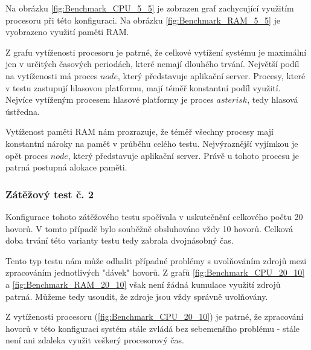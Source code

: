 \documentclass[ing,male,java,dept460]{diploma}						%
\begin{document}
Na obrázku \ref{fig:Benchmark_CPU_5_5} je zobrazen graf zachycující využitím procesoru při této konfiguraci. Na obrázku \ref{fig:Benchmark_RAM_5_5} je vyobrazeno využití paměti RAM.


Z grafu vytíženosti procesoru je patrné, že celkové vytížení systému je maximální jen v určitých časových periodách, které nemají dlouhého trvání. Největší podíl na vytíženosti má proces $node$, který představuje aplikační server. Procesy, které v testu zastupují hlasovou platformu, mají téměř konstantní podíl využití. Nejvíce vytíženým procesem hlasové platformy je proces $asterisk$, tedy hlasová ústředna.

Vytíženost paměti RAM nám prozrazuje, že téměř všechny procesy mají konstantní nároky na paměť v průběhu celého testu. Nejvýraznější vyjímkou je opět proces $node$, který představuje aplikační server. Právě u tohoto procesu je patrná postupná alokace paměti.

\subsubsection{Zátěžový test č. 2}
Konfigurace tohoto zátěžového testu spočívala v uskutečnění celkového počtu 20 hovorů. V tomto případě bylo souběžně obsluhováno vždy 10 hovorů. Celková doba trvání této varianty testu tedy zabrala dvojnásobný čas.


Tento typ testu nám může odhalit případné problémy s uvolňováním zdrojů mezi zpracováním jednotlivých "dávek" hovorů. Z grafů \ref{fig:Benchmark_CPU_20_10} a \ref{fig:Benchmark_RAM_20_10} však není žádná kumulace využití zdrojů patrná. Můžeme tedy usoudit, že zdroje jsou vždy správně uvolňovány.

Z vytíženosti procesoru (\ref{fig:Benchmark_CPU_20_10}) je patrné, že zpracování hovorů v této konfiguraci systém stále zvládá bez sebemenšího problému - stále není ani zdaleka využit veškerý procesorový čas.
\end{document}
